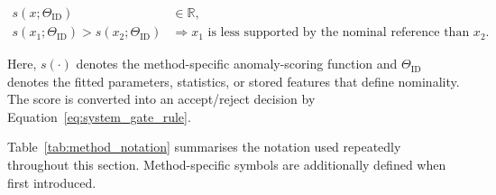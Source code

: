 \documentclass[fleqn,12pt]{olplainarticle}
\begin{document}
\begin{equation}
    \begin{aligned}
        s(x;\Theta_{\mathrm{ID}})&\in\mathbb{R},\\
        s(x_1;\Theta_{\mathrm{ID}})>s(x_2;\Theta_{\mathrm{ID}})
        &\Longrightarrow
        x_1 \text{ is less supported by the nominal reference than } x_2.
    \end{aligned}
    \label{eq:method_generic_score}
\end{equation}

Here, $s(\cdot)$ denotes the method-specific anomaly-scoring function and
$\Theta_{\mathrm{ID}}$ denotes the fitted parameters, statistics, or stored
features that define nominality. The score is converted into an accept/reject
decision by Equation~\ref{eq:system_gate_rule}.

Table~\ref{tab:method_notation} summarises the notation used repeatedly
throughout this section. Method-specific symbols are additionally defined
when first introduced.
\end{document}
